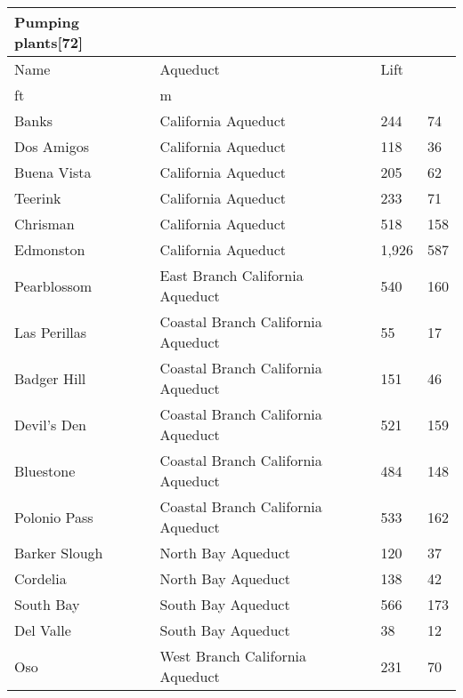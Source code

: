 \documentclass{article}
\begin{document}
\begin{table}[!ht]
    \centering
    \begin{tabular}{|l|l|l|l|}
    \hline
        Pumping plants[72]  & ~ & ~ & ~ \\ \hline
        Name & Aqueduct & Lift  & ~ \\ \hline
        ft & m  & ~ & ~ \\ \hline
        Banks & California Aqueduct & 244 & 74  \\ \hline
        Dos Amigos & California Aqueduct & 118 & 36  \\ \hline
        Buena Vista & California Aqueduct & 205 & 62  \\ \hline
        Teerink & California Aqueduct & 233 & 71  \\ \hline
        Chrisman & California Aqueduct & 518 & 158  \\ \hline
        Edmonston & California Aqueduct & 1,926 & 587  \\ \hline
        Pearblossom & East Branch California Aqueduct & 540 & 160  \\ \hline
        Las Perillas & Coastal Branch California Aqueduct & 55 & 17  \\ \hline
        Badger Hill & Coastal Branch California Aqueduct & 151 & 46  \\ \hline
        Devil's Den & Coastal Branch California Aqueduct & 521 & 159  \\ \hline
        Bluestone & Coastal Branch California Aqueduct & 484 & 148  \\ \hline
        Polonio Pass & Coastal Branch California Aqueduct & 533 & 162  \\ \hline
        Barker Slough & North Bay Aqueduct & 120 & 37  \\ \hline
        Cordelia & North Bay Aqueduct & 138 & 42  \\ \hline
        South Bay & South Bay Aqueduct & 566 & 173  \\ \hline
        Del Valle & South Bay Aqueduct & 38 & 12  \\ \hline
        Oso & West Branch California Aqueduct & 231 & 70  \\ \hline
    \end{tabular}
\end{table}
\end{document}

